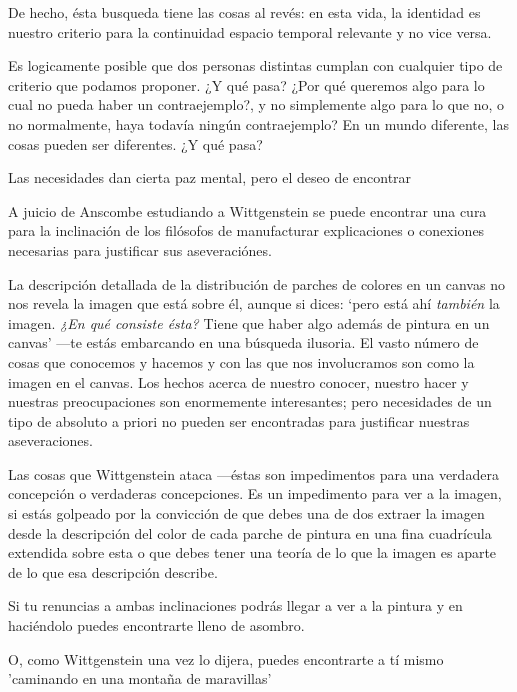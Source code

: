 De hecho, ésta busqueda tiene las cosas al revés: en esta vida, la identidad es nuestro criterio para la continuidad espacio temporal relevante y no vice versa. 

Es logicamente posible que dos personas distintas cumplan con cualquier tipo de criterio que podamos proponer.  ¿Y qué pasa? 
¿Por qué queremos algo para lo cual no pueda haber un contraejemplo?, y no simplemente algo para lo que no, o no normalmente, haya todavía ningún contraejemplo?
En un mundo diferente, las cosas pueden ser diferentes. ¿Y qué pasa?

  Las necesidades dan cierta paz mental, pero el deseo de encontrar 

      A juicio de Anscombe estudiando a Wittgenstein se puede encontrar una cura
      para la inclinación de los filósofos de manufacturar explicaciones o
      conexiones necesarias para justificar sus aseveraciónes.

      La descripción detallada de la distribución de parches de colores en un
      canvas no nos revela la imagen que está sobre él, aunque si dices: `pero
      está ahí \emph{también} la imagen. \emph{¿En qué consiste ésta?} Tiene
      que haber algo además de pintura en un canvas' ---te estás embarcando en
      una búsqueda ilusoria. El vasto número de cosas que conocemos y hacemos
      y con las que nos involucramos son como la imagen en el canvas. Los
      hechos acerca de nuestro conocer, nuestro hacer y nuestras
      preocupaciones son enormemente interesantes; pero necesidades de un tipo
      de absoluto a priori no pueden ser encontradas para justificar nuestras
      aseveraciones.

      Las cosas que Wittgenstein ataca ---éstas son impedimentos para una verdadera
      concepción o verdaderas concepciones. Es un impedimento para ver a la imagen,
      si estás golpeado por la convicción de que debes una de dos extraer la imagen
      desde la descripción del color de cada parche de pintura en una fina
      cuadrícula extendida sobre esta o que debes tener una teoría de lo que la
      imagen es aparte de lo que esa descripción describe.

      Si tu renuncias a ambas inclinaciones podrás llegar a ver a la pintura y en
      haciéndolo puedes encontrarte lleno de asombro.

      O, como Wittgenstein una vez lo dijera, puedes encontrarte a tí mismo 'caminando
      en una montaña de maravillas'


